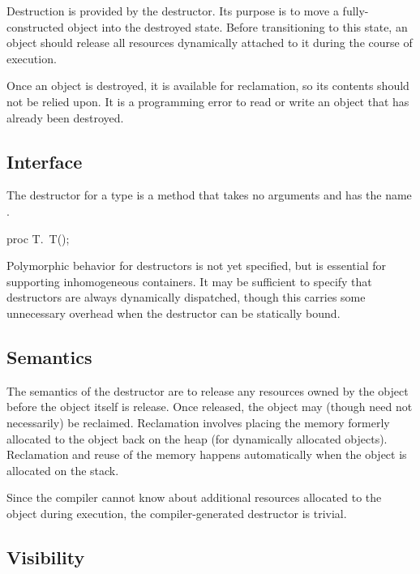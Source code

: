 Destruction is provided by the destructor.  Its purpose is to move a
fully-constructed object into the destroyed state.  Before transitioning to this
state, an object should release all resources dynamically attached to it during
the course of execution.

Once an object is destroyed, it is available for reclamation, so its contents
should not be relied upon.  It is a programming error to read or write an object
that has already been destroyed.

\subsection{Interface}

The destructor for a type  is a method that takes no arguments and has
the name .

\begin{chapel}
proc T.~T();
\end{chapel}

\begin{openissue}
Polymorphic behavior for destructors is not yet specified, but is essential for
supporting inhomogeneous containers.  It may be sufficient to specify that
destructors are always dynamically dispatched, though this carries some
unnecessary overhead when the destructor can be statically bound.
\end{openissue}

\subsection{Semantics}

The semantics of the destructor are to release any resources owned by the object
before the object itself is release.  Once released, the object may (though need
not necessarily) be reclaimed.  Reclamation involves placing the memory formerly
allocated to the object back on the heap (for dynamically allocated objects).
Reclamation and reuse of the memory happens automatically when the object is
allocated on the stack.

Since the compiler cannot know about additional resources allocated to the
object during execution, the compiler-generated destructor is trivial.

\subsection{Visibility}

